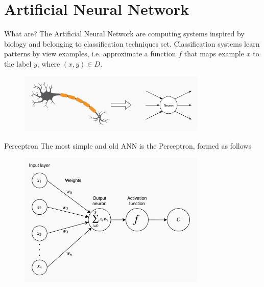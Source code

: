 \documentclass[xcolor={usenames}]{beamer}
\begin{document}
  \section{Artificial Neural Network}
  \begin{frame}{What are?}
  	The Artificial Neural Network are computing systems inspired by biology and belonging to classification techniques set. Classification systems learn patterns by view examples, i.e. approximate a function $f$ that maps example $x$ to the label $y$, where $(x, y) \in D$.
  	\begin{figure}
  		\includegraphics[width=0.8\textwidth]{../figures/neuron.png}
  	\end{figure}
  \end{frame}
  \begin{frame}{Perceptron}
  	The most simple and old ANN \cite{ROSE:1958} is the Perceptron, formed as follows
  	\begin{figure}[t]
		\centering
		\includegraphics[width=0.8\textwidth]{../figures/perceptron.png}
	\end{figure}	
  \end{frame}
\end{document}
